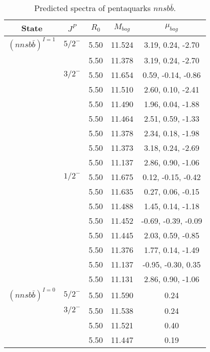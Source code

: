 \documentclass[prd,twocolumn,floatfix,nofootinbib]{revtex4}
\begin{document}
\renewcommand{\tabcolsep}{0.5cm}
\renewcommand{\arraystretch}{1.2}
\begin{table*}[!htbp]
    \caption{Predicted spectra of pentaquarks $nnsb\bar{b}$.}
    \begin{tabular}{ccccc}
        \hline\hline
        {\rm State} &$J^{P}$ &$R_{0}$ &$M_{bag}$ &$\mu_{bag}$ \\ \hline
        ${(nnsb\bar{b})}^{I=1}$
            &${5/2}^{-}$    &5.50   &11.524 &3.19, 0.24, -2.70 \\
            &               &5.50   &11.378 &3.19, 0.24, -2.70  \\
            &${3/2}^{-}$    &5.50   &11.654 &0.59, -0.14, -0.86 \\
            &               &5.50   &11.510 &2.60, 0.10, -2.41  \\
            &               &5.50   &11.490 &1.96, 0.04, -1.88  \\
            &               &5.50   &11.464 &2.51, 0.59, -1.33  \\
            &               &5.50   &11.378 &2.34, 0.18, -1.98  \\
            &               &5.50   &11.373 &3.18, 0.24, -2.69  \\
            &               &5.50   &11.137 &2.86, 0.90, -1.06  \\
            &${1/2}^{-}$    &5.50   &11.675 &0.12, -0.15, -0.42  \\
            &               &5.50   &11.635 &0.27, 0.06, -0.15  \\
            &               &5.50   &11.488 &1.45, 0.14, -1.18  \\
            &               &5.50   &11.452 &-0.69, -0.39, -0.09  \\
            &               &5.50   &11.445 &2.03, 0.59, -0.85  \\
            &               &5.50   &11.376 &1.77, 0.14, -1.49  \\
            &               &5.50   &11.137 &-0.95, -0.30, 0.35  \\
            &               &5.50   &11.131 &2.86, 0.90, -1.06  \\
        ${(nnsb\bar{b})}^{I=0}$
            &${5/2}^{-}$    &5.50   &11.590 &0.24 \\
            &${3/2}^{-}$    &5.50   &11.538 &0.24  \\
            &               &5.50   &11.521 &0.40 \\
            &               &5.50   &11.447 &0.19  \\

\end{tabular}
\end{table*}
\end{document}
